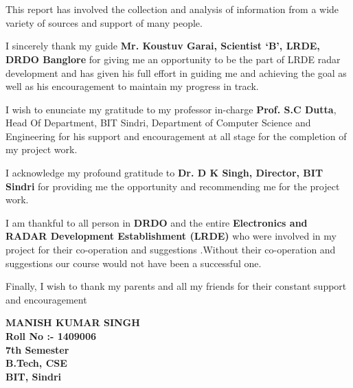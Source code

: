 \documentclass[14pt]{article} %
\begin{document}
\newpage
\thispagestyle{plain}
\section*{\LARGE\bfseries{\\ }}
This report has involved the collection and analysis of information from a wide variety of sources and support of many people.
\\
 \par         I sincerely thank my guide \textbf{Mr. Koustuv Garai, Scientist `B', LRDE, DRDO Banglore} for giving me an opportunity to be the part of LRDE radar development and has given his full effort in guiding me and achieving the goal as well as his encouragement to maintain my progress in track.
 \\
  \par       I wish to enunciate my gratitude to my professor in-charge \textbf{Prof. S.C Dutta}, Head Of Department, BIT Sindri, Department of Computer Science and Engineering for his support and encouragement at all stage for the completion of my project work.
  \\
 \par       I acknowledge my profound gratitude to\textbf{ Dr. D K Singh, Director, BIT Sindri} for providing me the opportunity and recommending me for the project work.\\
 \par        I am thankful to all person in \textbf{DRDO} and the entire \textbf{Electronics and RADAR Development Establishment (LRDE)} who were involved in my project for their co-operation and suggestions .Without their co-operation and suggestions our course would not have been a successful one.\\

 \par        Finally, I wish to thank my parents and all my friends for their constant support and encouragement
 \vspace{2cm}
  \begin{flushright}
 \begin{minipage}[t]{7cm}

\centering
\textbf{ MANISH KUMAR SINGH \\
 Roll No :- 1409006 \\
7th Semester \\
 B.Tech, CSE\\
BIT, Sindri}

 \end{minipage}
 
 \end{flushright}
\end{document}
